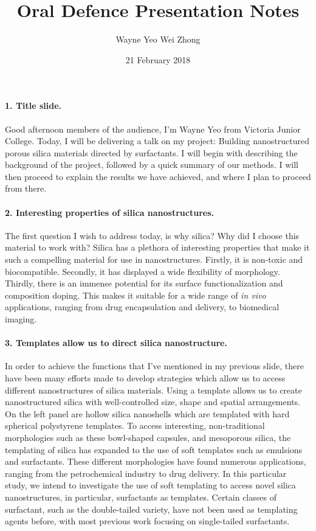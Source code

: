 \documentclass[a4paper,12pt]{article}
\date{21  February 2018}
\author{Wayne Yeo Wei Zhong} %
\title{Oral Defence Presentation Notes} %
\begin{document}
	\maketitle
	
	\paragraph{1. Title slide.}Good afternoon members of the audience, I'm Wayne Yeo from Victoria Junior College. Today, I will be delivering a talk on my project: Building nanostructured porous silica materials directed by surfactants.
\bigbreak
I will begin with describing the background of the project, followed by a quick summary of our methods. I will then proceed to explain the results we have achieved, and where I plan to proceed from there.

	\paragraph{2. Interesting properties of silica nanostructures.}The first question I wish to address today, is why silica? Why did I choose this material to work with?
\bigbreak
Silica has a plethora of interesting properties that make it such a compelling material for use in nanostructures. Firstly, it is non-toxic and biocompatible. Secondly, it has displayed a wide flexibility of morphology. Thirdly, there is an immense potential for its surface functionalization and composition doping. 
\bigbreak
This makes it suitable for a wide range of \textit{in vivo} applications, ranging from drug encapsulation and delivery, to biomedical imaging.

	\paragraph{3. Templates allow us to direct silica nanostructure.}In order to achieve the functions that I've mentioned in my previous slide, there have been many efforts made to develop strategies which allow us to access different nanostructures of silica materials. Using a template allows us to create nanostructured silica with well-controlled size, shape and spatial arrangements.
\bigbreak
On the left panel are hollow silica nanoshells which are templated with hard spherical polystyrene templates. To access interesting, non-traditional morphologies such as these bowl-shaped capsules, and mesoporous silica, the templating of silica has expanded to the use of soft templates such as emulsions and surfactants. These different morphologies have found numerous applications, ranging from the petrochemical industry to drug delivery.
\bigbreak
In this particular study, we intend to investigate the use of soft templating to access novel silica nanostructures, in particular, surfactants as templates. Certain classes of surfactant, such as the double-tailed variety, have not been used as templating agents before, with most previous work focusing on single-tailed surfactants.
\end{document}

